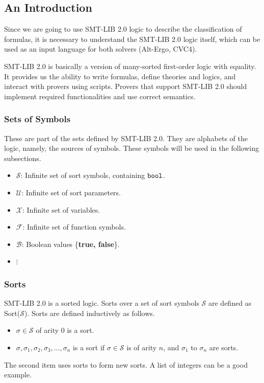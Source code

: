 \documentclass[10pt,twocolumn,letter]{article}
\theoremstyle{definition}
\begin{document}
\subsection{An Introduction}

Since we are going to use SMT-LIB 2.0 logic to describe the classification of formulas, it is necessary to understand the SMT-LIB 2.0 logic itself, which can be used as an input language for both solvers (Alt-Ergo, CVC4).

SMT-LIB 2.0 is basically a version of many-sorted first-order logic with equality\cite{bs2010}. It provides us the ability to write formulas, define theories and logics, and interact with provers using scripts. Provers that support SMT-LIB 2.0 should implement required functionalities and use correct semantics.

\subsubsection{Sets of Symbols}

These are part of the sets defined by SMT-LIB 2.0\cite{barrett:smt-lib:2010}. They are alphabets of the logic, namely, the sources of symbols. These symbols will be used in the following subsections.
\begin{itemize}
\item $\mathcal{S}$: Infinite set of sort symbols, containing $\tt bool$.
\item $\mathcal{U}$: Infinite set of sort parameters.
\item $\mathcal{X}$: Infinite set of variables.
\item $\mathcal{F}$: Infinite set of function symbols.
\item $\mathcal{B}$: Boolean values \{{\bf true, false}\}.
\item \qquad$\vdots$
\end{itemize}



\subsubsection{Sorts}

SMT-LIB 2.0 is a sorted logic. Sorts over a set of sort symbols $\mathcal{S}$ are defined as Sort($\mathcal{S}$). Sorts are defined inductively as follows.

\begin{itemize}
\item $\sigma \in \mathcal{S}$ of arity 0 is a sort.
\item $\sigma,\sigma_1, \sigma_2, \sigma_3, \ldots, \sigma_n$ is a sort if $\sigma \in \mathcal{S}$ is of arity $n$, and $\sigma_1$ to $\sigma_n$ are sorts.
\end{itemize}
The second item uses sorts to form new sorts. A list of integers can be a good example.
\end{document}
